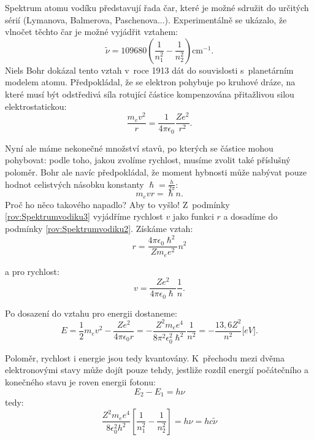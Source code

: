 Spektrum atomu vodíku představují řada čar, které je možné sdružit do určitých sérií (Lymanova, Balmerova, Paschenova...). Experimentálně se ukázalo, že vlnočet těchto čar je možné vyjádřit vztahem:
\begin{equation}
\tilde{\nu} = 109680\left( \frac{1}{n_1^2} - \frac{1}{n_2^2}\right ) \mathrm{cm} ^{-1}\mbox{.}
\label{rov:Spektrumvodiku1}
\end{equation}
Niels Bohr dokázal tento vztah v~roce 1913 dát do souvislosti s~planetárním modelem atomu. Předpokládal, že se elektron pohybuje po kruhové dráze, na které musí být odstředivá síla rotující částice kompenzována přitažlivou silou elektrostatickou:
\begin{equation}
\frac{m_{e}v^2}{r} = \frac{1}{4\pi \epsilon_0}\frac{Ze^2}{r^2}\mbox{.}
\label{rov:Spektrumvodiku2}
\end{equation}

\noindent Nyní ale máme nekonečné množství stavů, po kterých se částice mohou pohybovat: podle toho, jakou zvolíme rychlost, musíme zvolit také příslušný poloměr. Bohr ale navíc předpokládal, že moment hybnosti může nabývat pouze hodnot celistvých násobku konstanty $\hslash=\frac{h}{2\pi}$:
\begin{equation}
m_{e}vr = \hslash n \mbox{.}
\label{rov:Spektrumvodiku3}
\end{equation}
\noindent Proč ho něco takového napadlo? Aby to vyšlo! Z~podmínky \ref{rov:Spektrumvodiku3} vyjádříme rychlost $v$ jako funkci $r$ a dosadíme do podmínky \ref{rov:Spektrumvodiku2}. Získáme vztah:
\begin{equation}
r = \frac{4\pi\epsilon_0\hslash^2}{Zm_e e^2}n^2
\label{rov:Spektrumvodiku4}
\end{equation}

\noindent a pro rychlost:
\begin{equation}
v = \frac{Ze^2}{4\pi\epsilon_0\hslash}\frac{1}{n}\mbox{.}
\label{rov:Spektrumvodiku5}
\end{equation}

\noindent Po dosazení do vztahu pro energii dostaneme:
\begin{equation}
E = \frac{1}{2}m_e v^2 - \frac{Ze^2}{4\pi\epsilon_0r} = - \frac{Z^2m_e e^4}{8 \pi^2 \epsilon_0^2\hslash^2}\frac{1}{n^2} = -\frac{13,6 Z^2}{n^2}\mathrm[eV]\mbox{.}
\label{Spektrumvodiku6}
\end{equation}

\noindent Poloměr, rychlost i energie jsou tedy kvantovány. K~přechodu mezi dvěma elektronovými stavy může dojít pouze tehdy, jestliže rozdíl energií počátečního a konečného stavu je roven energii fotonu:
\begin{equation}
E_2-E_1 = h\nu 
\label{rov:Spektrumvodiku7}
\end{equation}
tedy:
\begin{equation}
\frac{Z^2m_e e^4}{8\epsilon_0^2h^2}\left[ \frac{1}{n_1^2} - \frac{1}{n_2^2} \right ] = h\nu = hc\tilde{\nu}
\label{rov:Spektrumvodiku8}
\end{equation}


